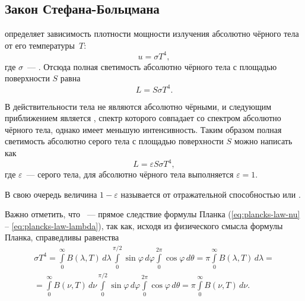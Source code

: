 \subsection{Закон Стефана-Больцмана}
\label{subsec:stef-boltz-law}
 определяет зависимость плотности мощности излучения абсолютно чёрного тела от его температуры~$T$:
\begin{equation}
    u = \sigma T^4,
\end{equation}
где $\sigma$~--- .
Отсюда полная светимость абсолютно чёрного тела с площадью поверхности $S$ равна
\begin{equation}
    L = S \sigma T^4.
    \label{eq:steff-bol-law}
\end{equation}

В действительности тела не являются абсолютно чёрными, и следующим приближением является , спектр которого совпадает со спектром абсолютно чёрного тела, однако имеет меньшую интенсивность. Таким образом полная светимость абсолютно серого тела с площадью поверхности $S$ можно написать как
\begin{equation}
    L = \varepsilon S \sigma T^4,
\end{equation}
где $\varepsilon$~---  серого тела, для абсолютно чёрного тела выполняется $\varepsilon = 1$. 

В свою очередь величина $1 - \varepsilon$ называется от отражательной способностью или .

Важно отметить, что ~--- прямое следствие формулы Планка (\ref{eq:plancks-law-nu} -- \ref{eq:plancks-law-lambda}), так как, исходя из физического смысла формулы Планка, справедливы равенства
\begin{multline}
    \sigma T^4
    = \int\limits^\infty_0 B(\lambda, T) \,d \lambda \int\limits_0^{\pi/2} \sin \varphi \,d \varphi \int\limits_0^{2\pi} \cos \varphi \,d \theta
    = \pi \int\limits^\infty_0 B(\lambda, T) \,d \lambda =\\
    = \int\limits^\infty_0 B(\nu, T) \,d \nu \int\limits_0^{\pi/2} \sin \varphi \,d \varphi \int\limits_0^{2\pi} \cos \varphi \,d \theta
    = \pi \int\limits^\infty_0 B(\nu, T) \,d \nu.
\end{multline}


